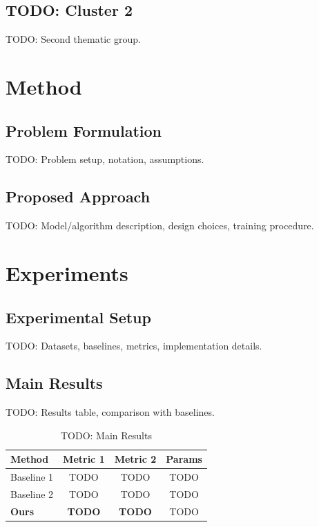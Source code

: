 \documentclass[journal]{IEEEtran}
\begin{document}
\subsection{TODO: Cluster 2}
TODO: Second thematic group.

\section{Method}
\label{sec:method}

\subsection{Problem Formulation}
TODO: Problem setup, notation, assumptions.

\subsection{Proposed Approach}
TODO: Model/algorithm description, design choices, training procedure.

\section{Experiments}
\label{sec:experiments}

\subsection{Experimental Setup}
TODO: Datasets, baselines, metrics, implementation details.

\subsection{Main Results}
TODO: Results table, comparison with baselines.

\begin{table}[htbp]
\caption{TODO: Main Results}
\label{tab:main_results}
\centering
\begin{tabular}{lccc}
\toprule
Method & Metric 1 & Metric 2 & Params \\
\midrule
Baseline 1 & TODO & TODO & TODO \\
Baseline 2 & TODO & TODO & TODO \\
\textbf{Ours} & \textbf{TODO} & \textbf{TODO} & TODO \\
\bottomrule
\end{tabular}
\end{table}
\end{document}
